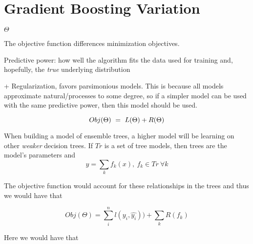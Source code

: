 \section{Gradient Boosting Variation}


$\Theta$

The objective function differences minimization objectives. 

Predictive power: how well the algorithm fits the data used for training and, hopefully, the \textit{true} underlying distribution

+ Regularization, favors parsimonious models. This is because all models approximate natural/processes to some degree, so if a simpler model can be used with the same predictive power, then this model should be used.  

\begin{equation} \label{eq:objFunction}
Obj(\Theta) \ = \ L(\Theta) + R(\Theta)
\\
\end{equation}

When building a model of ensemble trees, a higher model will be learning on other \textit{weaker} decision trees. If $Tr$ is a set of tree models, then trees are the model's parameters and
\[ y = \sum_k f_k(x) , \ f_k \in Tr \ \forall k \]
 
The objective function would account for these relationships in the trees and thus we would have that
 
\[ Obj(\Theta) = \sum_i^n l(y_i,\hat{y_i}))  +  \sum_k R(f_k) \] 

%    

Here we would have that 



